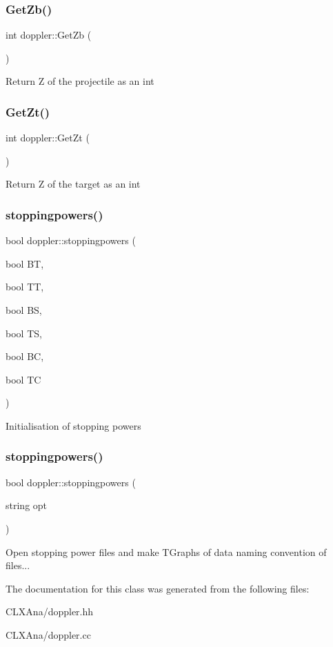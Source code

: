 \subsubsection{\texorpdfstring{Get\+Zb()}{GetZb()}}
{\footnotesize\ttfamily int doppler\+::\+Get\+Zb (\begin{DoxyParamCaption}{ }\end{DoxyParamCaption})}

Return Z of the projectile as an int \mbox{\label{classdoppler_ac0587ca2b963edec86d17dd6dac024ce}} 
\subsubsection{\texorpdfstring{Get\+Zt()}{GetZt()}}
{\footnotesize\ttfamily int doppler\+::\+Get\+Zt (\begin{DoxyParamCaption}{ }\end{DoxyParamCaption})}

Return Z of the target as an int \mbox{\label{classdoppler_a0ab0f803a7ab47bf2d087ee973ccdbc3}} 
\subsubsection{\texorpdfstring{stoppingpowers()}{stoppingpowers()}\hspace{0.1cm}{\footnotesize\ttfamily [1/2]}}
{\footnotesize\ttfamily bool doppler\+::stoppingpowers (\begin{DoxyParamCaption}\item[{bool}]{BT,  }\item[{bool}]{TT,  }\item[{bool}]{BS,  }\item[{bool}]{TS,  }\item[{bool}]{BC,  }\item[{bool}]{TC }\end{DoxyParamCaption})}

Initialisation of stopping powers \mbox{\label{classdoppler_a4be762591578e28f8e9d646475ca943a}} 
\subsubsection{\texorpdfstring{stoppingpowers()}{stoppingpowers()}\hspace{0.1cm}{\footnotesize\ttfamily [2/2]}}
{\footnotesize\ttfamily bool doppler\+::stoppingpowers (\begin{DoxyParamCaption}\item[{string}]{opt }\end{DoxyParamCaption})}

Open stopping power files and make T\+Graphs of data naming convention of files... 

The documentation for this class was generated from the following files\+:\begin{DoxyCompactItemize}
\item 
C\+L\+X\+Ana/doppler.\+hh\item 
C\+L\+X\+Ana/doppler.\+cc\end{DoxyCompactItemize}
